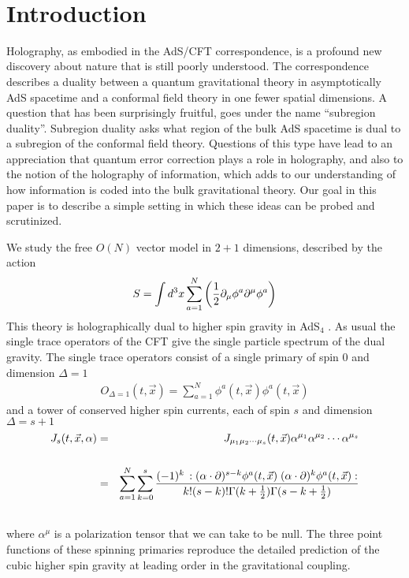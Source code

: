 \documentclass[a4paper,12pt]{article}
\def\bea{\begin{eqnarray}}
\def\eea{\end{eqnarray}}
\begin{document}
\setcounter{page}{0}
\setcounter{tocdepth}{2}
\newpage
\setcounter{footnote}{0}
\linespread{1.1}
\parskip 4pt

{}~
{}~

\section{Introduction}

Holography, as embodied in the AdS/CFT correspondence\cite{Maldacena:1997re,Witten:1998qj,Gubser:1998bc}, is a 
profound new discovery about nature that is still poorly understood.
The correspondence describes a duality between a quantum gravitational theory in asymptotically AdS spacetime and 
a conformal field theory in one fewer spatial dimensions.
A question that has been surprisingly fruitful, goes under the name ``subregion duality''.
Subregion duality asks what region of the bulk AdS spacetime is dual to a subregion of the conformal field theory.
Questions of this type have lead to an appreciation that quantum error correction plays a role in 
holography\cite{Almheiri:2014lwa,Pastawski:2015qua,Harlow:2016vwg}, and also
to the notion of the holography of 
information\cite{Laddha:2020kvp,Banerjee:2016mhh,Penington:2019npb,Almheiri:2019psf,Almheiri:2019yqk,Penington:2019kki,Almheiri:2019qdq}, which adds to our understanding of
how information is coded into the bulk gravitational theory.
Our goal in this paper is to describe a simple setting in which these ideas can be probed and scrutinized.

We study the free $O(N)$ vector model in $2+1$ dimensions, described by the action
%
\bea
S=\int d^3 x \sum_{a=1}^N \left({1\over 2}\partial_\mu\phi^a \partial^\mu\phi^a\right)\label{cftaction}
\eea
%
This theory is holographically dual \cite{Klebanov:2002ja,Sezgin:2002rt}
 to higher spin gravity in AdS$_4$ \cite{Vasiliev:1990en,Vasiliev:2003ev,Didenko:2014dwa}.
As usual the single trace operators of the CFT give the single particle spectrum of the dual gravity.
The single trace operators consist of a single primary of spin 0 and dimension $\Delta=1$
%
\bea
O_{\Delta=1}(t,\vec{x})=\sum_{a=1}^N \phi^a(t,\vec{x})\phi^a(t,\vec{x})
\eea
%
and a tower of conserved higher spin currents, each of spin $s$ and dimension $\Delta=s+1$
%
\begin{eqnarray}
J_s(t,\vec{x},\alpha)
&=&J_{\mu_1\mu_2\cdots\mu_s}(t,\vec{x})\alpha^{\mu_1}\alpha^{\mu_2}\cdots \alpha^{\mu_s}\cr\cr
&=&\sum_{a=1}^N\sum_{k=0}^{s}
\frac{(-1)^k\, :(\alpha\cdot\partial)^{s-k}\phi^a(t,\vec{x})\;(\alpha\cdot\partial)^{k}\phi^a(t,\vec{x}) :}
{k!(s-k)!\Gamma(k+{1\over 2})\Gamma(s-k+{1\over 2})}
\cr
&&\label{scurrent}
\end{eqnarray}
%
where $\alpha^\mu$ is a polarization tensor that we can take to be null.
The three point functions of these spinning primaries reproduce the detailed prediction of the cubic
higher spin gravity \cite{Giombi:2009wh} at leading order in the gravitational coupling.
\end{document}
